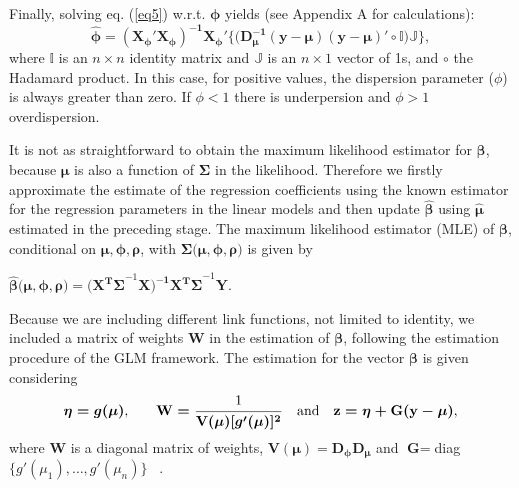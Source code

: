 \documentclass[useAMS,referee]{biom}
\begin{document}
Finally, solving eq. (\ref{eq5}) w.r.t. $\boldsymbol{\phi}$ yields (see Appendix A for calculations): 
\begin{equation}\label{eq6}
\boldsymbol{\hat{\phi}} = \mathbf{(X_\phi'X_\phi)^{-1}X_\phi'}\mathbf{\{(D_\mu^{-1}}(\mathbf{y}-\boldsymbol{\mu})(\mathbf{y}-\boldsymbol{\mu})'\circ \mathbb{I}) \mathbb{J}\},
\end{equation}
where $\mathbb{I}$ is an $n \times n$ identity matrix and $\mathbb{J}$ is an $n \times 1$ vector of 1s, and $\circ$ the Hadamard product. In this case, for positive values, the dispersion parameter ($\phi$) is always greater than zero. If $\phi < 1$ there is underpersion and $\phi>1$ overdispersion.

It is not as straightforward to obtain the maximum likelihood estimator for $\boldsymbol{\beta}$, because $\boldsymbol{\mu}$ is also a function of $\boldsymbol{\Sigma}$ in the likelihood. Therefore we firstly approximate the estimate of the regression coefficients using the known estimator for the regression parameters in the linear models and then update $\hat{\boldsymbol{\beta}}$ using $\boldsymbol{\hat{\mu}}$ estimated in the preceding stage.  The maximum likelihood estimator (MLE) of $\boldsymbol{\beta}$, conditional on $\boldsymbol{\mu},\boldsymbol{\phi},\boldsymbol{\rho}$, with $\boldsymbol{\Sigma(\mu},\boldsymbol{\phi},\boldsymbol{\rho})$ is given by ~\citep{laird1982random,molenberghs2000linear}
\begin{center}
$\boldsymbol{\hat{\beta}(\mu},\boldsymbol{\phi},\boldsymbol{\rho}) =  \mathbf{(X^{T}\boldsymbol{\Sigma}}^{-1}\mathbf{X)^{-1} X^{T}\boldsymbol{\Sigma}}^{-1}\mathbf{Y}$.
\end{center} 


Because we are including different link functions,  not limited to identity, we included a matrix of weights $\mathbf{W}$ in the estimation of $\boldsymbol{\beta}$, following the estimation procedure of the GLM framework. The estimation for the vector $\boldsymbol{\beta}$ is given considering
\begin{equation}
\boldsymbol{\eta} = g(\boldsymbol{\mu})\textnormal{,}  \qquad \mathbf{W} = \dfrac{\textnormal{1}}{\mathbf{V}(\boldsymbol{\mu})[g'(\boldsymbol{\mu})]^2} \quad \mbox{and} \quad \boldmath{\textbf{z} = \eta + \textbf{G}(\textbf{y} - \mu)}\textnormal{,}
\end{equation}  
where $\textbf{W}$ is a diagonal matrix of weights, $\mathbf{V}(\boldsymbol{\mu}) = \mathbf{D_\phi D_\mu}$ and $\textbf{G} =$diag$\{g'(\mu_1),\dots,g'(\mu_n)\}$ ~\citep{nelder1972generalized,mccullagh1989generalized}.
\end{document}
